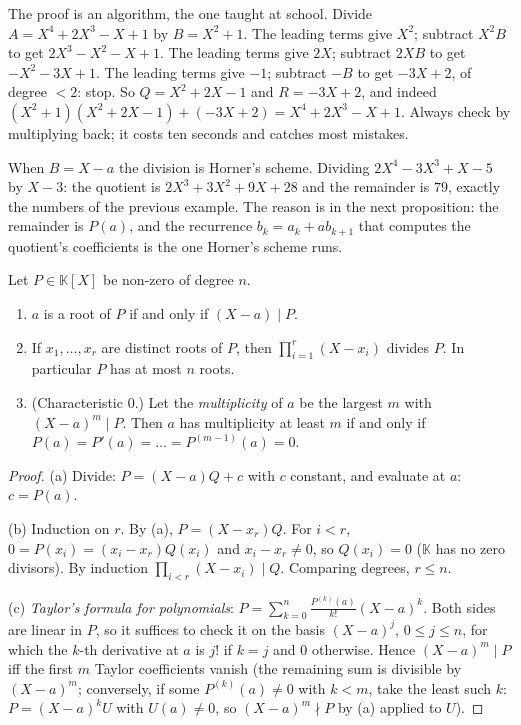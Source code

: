 \begin{examplex}
The proof is an algorithm, the one taught at school. Divide $A=X^4+2X^3-X+1$ by $B=X^2+1$. The leading terms give $X^2$; subtract $X^2B$ to
get $2X^3-X^2-X+1$. The leading terms give $2X$; subtract $2XB$ to get $-X^2-3X+1$. The leading terms give $-1$; subtract $-B$ to get $-3X+2$,
of degree $<2$: stop. So $Q=X^2+2X-1$ and $R=-3X+2$, and indeed $(X^2+1)(X^2+2X-1)+(-3X+2)=X^4+2X^3-X+1$. Always check by multiplying back; it costs
ten seconds and catches most mistakes.

When $B=X-a$ the division is Horner's scheme. Dividing $2X^4-3X^3+X-5$ by $X-3$: the quotient is $2X^3+3X^2+9X+28$ and the remainder is $79$,
exactly the numbers of the previous example. The reason is in the next proposition: the remainder is $P(a)$, and the recurrence
$b_k=a_k+ab_{k+1}$ that computes the quotient's coefficients is the one Horner's scheme runs.
\end{examplex}

\begin{proposition}[roots]\label{prop:rootsfactor}
Let $P\in\mathbb K[X]$ be non-zero of degree $n$.
\begin{enumerate}[label=(\alph*)]
\item $a$ is a root of $P$ if and only if $(X-a)\mid P$.
\item If $x_1,\dots,x_r$ are distinct roots of $P$, then $\prod_{i=1}^r(X-x_i)$ divides $P$. In particular $P$ has at most $n$ roots.
\item (Characteristic $0$.) Let the \emph{multiplicity} of $a$ be the largest $m$ with $(X-a)^m\mid P$. Then $a$ has multiplicity at least $m$ if and only if $P(a)=P'(a)=\dots=P^{(m-1)}(a)=0$.
\end{enumerate}
\end{proposition}
\begin{proof}
(a) Divide: $P=(X-a)Q+c$ with $c$ constant, and evaluate at $a$: $c=P(a)$.

(b) Induction on $r$. By (a), $P=(X-x_r)Q$. For $i<r$, $0=P(x_i)=(x_i-x_r)Q(x_i)$ and $x_i-x_r\ne0$, so $Q(x_i)=0$ ($\mathbb K$ has no zero divisors). By induction $\prod_{i<r}(X-x_i)\mid Q$. Comparing degrees, $r\le n$.

(c) \emph{Taylor's formula for polynomials}: $P=\sum_{k=0}^n\frac{P^{(k)}(a)}{k!}(X-a)^k$. Both sides are linear in $P$, so it suffices to check it on the basis $(X-a)^j$, $0\le j\le n$, for which the $k$-th derivative at $a$ is $j!$ if $k=j$ and $0$ otherwise. Hence $(X-a)^m\mid P$ iff the first $m$ Taylor coefficients vanish (the remaining sum is divisible by $(X-a)^m$; conversely, if some $P^{(k)}(a)\ne0$ with $k<m$, take the least such $k$: $P=(X-a)^kU$ with $U(a)\ne0$, so $(X-a)^m\nmid P$ by (a) applied to $U$).
\end{proof}

